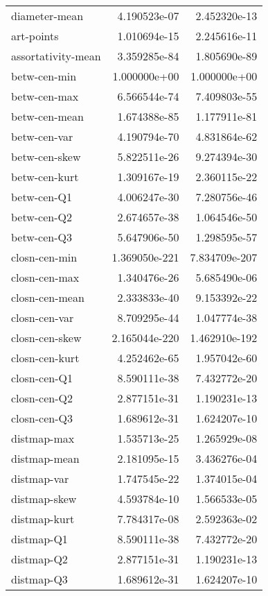\documentclass{report}
\begin{document}
\begin{longtable}{lrr}
	diameter-mean                 &   4.190523e-07 &   2.452320e-13 \\
	art-points                    &   1.010694e-15 &   2.245616e-11 \\
	assortativity-mean            &   3.359285e-84 &   1.805690e-89 \\
	betw-cen-min                  &   1.000000e+00 &   1.000000e+00 \\
	betw-cen-max                  &   6.566544e-74 &   7.409803e-55 \\
	betw-cen-mean                 &   1.674388e-85 &   1.177911e-81 \\
	betw-cen-var                  &   4.190794e-70 &   4.831864e-62 \\
	betw-cen-skew                 &   5.822511e-26 &   9.274394e-30 \\
	betw-cen-kurt                 &   1.309167e-19 &   2.360115e-22 \\
	betw-cen-Q1                   &   4.006247e-30 &   7.280756e-46 \\
	betw-cen-Q2                   &   2.674657e-38 &   1.064546e-50 \\
	betw-cen-Q3                   &   5.647906e-50 &   1.298595e-57 \\
	closn-cen-min                 &  1.369050e-221 &  7.834709e-207 \\
	closn-cen-max                 &   1.340476e-26 &   5.685490e-06 \\
	closn-cen-mean                &   2.333833e-40 &   9.153392e-22 \\
	closn-cen-var                 &   8.709295e-44 &   1.047774e-38 \\
	closn-cen-skew                &  2.165044e-220 &  1.462910e-192 \\
	closn-cen-kurt                &   4.252462e-65 &   1.957042e-60 \\
	closn-cen-Q1                  &   8.590111e-38 &   7.432772e-20 \\
	closn-cen-Q2                  &   2.877151e-31 &   1.190231e-13 \\
	closn-cen-Q3                  &   1.689612e-31 &   1.624207e-10 \\
	distmap-max                   &   1.535713e-25 &   1.265929e-08 \\
	distmap-mean                  &   2.181095e-15 &   3.436276e-04 \\
	distmap-var                   &   1.747545e-22 &   1.374015e-04 \\
	distmap-skew                  &   4.593784e-10 &   1.566533e-05 \\
	distmap-kurt                  &   7.784317e-08 &   2.592363e-02 \\
	distmap-Q1                    &   8.590111e-38 &   7.432772e-20 \\
	distmap-Q2                    &   2.877151e-31 &   1.190231e-13 \\
	distmap-Q3                    &   1.689612e-31 &   1.624207e-10 \\
\end{longtable}
\end{document}
